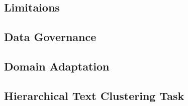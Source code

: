 \subsection{Limitaions}


\subsection{Data Governance}


\subsection{Domain Adaptation}


\subsection{Hierarchical Text Clustering Task}
